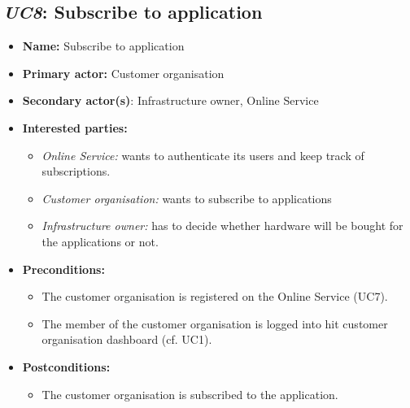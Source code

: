 \documentclass[english]{sareport}
\begin{document}
\subsection{\emph{UC8}: Subscribe to application}
\begin{itemize}
    \item \textbf{Name:} Subscribe to application
    \item \textbf{Primary actor:} Customer organisation
    \item \textbf{Secondary actor(s)}: Infrastructure owner, Online Service
    \item \textbf{Interested parties:} 
        \begin{itemize}
            \item \textit{Online Service:} wants to authenticate its users and keep track of subscriptions.
            \item \textit{Customer organisation:} wants to subscribe to applications
            \item \textit{Infrastructure owner:} has to decide whether hardware will be bought for the applications or not.
        \end{itemize}

    \item \textbf{Preconditions:}
        \begin{itemize}
            \item The customer organisation is registered on the Online Service (UC7).
            \item The member of the customer organisation is logged into hit customer organisation dashboard (cf. UC1).
        \end{itemize}

    \item \textbf{Postconditions:}
        \begin{itemize}
            \item The customer organisation is subscribed to the application.

        \end{itemize}


\end{itemize}
\end{document}
